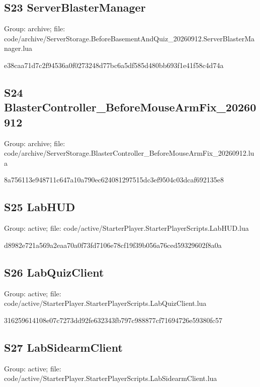 \subsection{S23 ServerBlasterManager}
Group: archive; file: code/\allowbreak{}archive/\allowbreak{}ServerStorage.\allowbreak{}BeforeBasementAndQuiz\_\allowbreak{}20260912.\allowbreak{}ServerBlasterManager.\allowbreak{}lua

\begin{flushleft}\ttfamily\footnotesize e38caa71d7c2f94536a0f0273248d77bc6a5df585d480bb693f1e41f58c4d74a\end{flushleft}
\subsection{S24 BlasterController\_\allowbreak{}BeforeMouseArmFix\_\allowbreak{}20260912}
Group: archive; file: code/\allowbreak{}archive/\allowbreak{}ServerStorage.\allowbreak{}BlasterController\_\allowbreak{}BeforeMouseArmFix\_\allowbreak{}20260912.\allowbreak{}lua

\begin{flushleft}\ttfamily\footnotesize 8a756113e948711c647a10a790ec624081297515dc3ef9504c03dcaf692135e8\end{flushleft}
\subsection{S25 LabHUD}
Group: active; file: code/\allowbreak{}active/\allowbreak{}StarterPlayer.\allowbreak{}StarterPlayerScripts.\allowbreak{}LabHUD.\allowbreak{}lua

\begin{flushleft}\ttfamily\footnotesize d8982e721a569a2eaa70a0f73fd7106e78cf19f39b056a76ced59329602f8a0a\end{flushleft}
\subsection{S26 LabQuizClient}
Group: active; file: code/\allowbreak{}active/\allowbreak{}StarterPlayer.\allowbreak{}StarterPlayerScripts.\allowbreak{}LabQuizClient.\allowbreak{}lua

\begin{flushleft}\ttfamily\footnotesize 316259614108e07c7273dd92fe632343fb797c988877cf71694726e59380fc57\end{flushleft}
\subsection{S27 LabSidearmClient}
Group: active; file: code/\allowbreak{}active/\allowbreak{}StarterPlayer.\allowbreak{}StarterPlayerScripts.\allowbreak{}LabSidearmClient.\allowbreak{}lua


